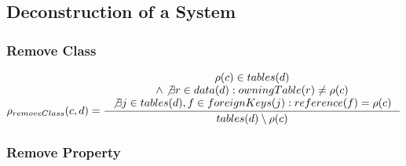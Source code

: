 \documentclass[11pt]{article}
\begin{document}
\subsection{Deconstruction of a System}
\subsubsection{Remove Class}
$
\rho_{removeClass}(c,d) = \inference{\rho(c) \in tables(d) \\ \wedge \not \exists r \in data(d) : owningTable(r) \neq \rho(c) \\ \not \exists j \in tables(d), f \in foreignKeys(j) : reference(f) = \rho(c)  }{tables(d) \setminus \rho(c)}
$

\subsubsection{Remove Property}



	
\end{document}
